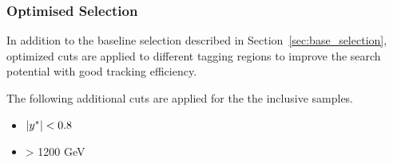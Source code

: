 %
%
\subsubsection{Optimised Selection}
\label{sec:analysiscuts}

In addition to the baseline selection described in Section~\ref{sec:base_selection}, optimized cuts are  applied to different tagging regions to improve the search potential with good tracking efficiency. 

The following additional cuts are applied for the the inclusive samples.
\begin{itemize}
	\item $|y^\ast| < 0.8$
	\item \mjj > 1200 GeV
\end{itemize}

